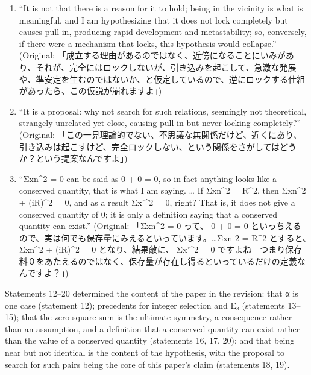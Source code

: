 \documentclass[
  a4paper,
]{article}
\begin{document}
\begin{enumerate}
  experiments too, without placing Σxn\^{}2=0 or U\^{}n=I as assumptions
  to derive from, they turned out to hold as a result; this is an
  empirical rule.'' (Original: 「Σxn\^{}2 = 0 も、U\^{}n=I
  と同様に、むしろ仮定ではなく、他の対称性の組み合わせで結果的に導出される\ldots 実際も過去の実験でも、Σxn\^{}2=0
  、U\^{}n=I
  を仮定として置いて導出しなくても、結果的に、それが成り立っていたという経験則です。」)
\item
  ``It is not that there is a reason for it to hold; being in the
  vicinity is what is meaningful, and I am hypothesizing that it does
  not lock completely but causes pull-in, producing rapid development
  and metastability; so, conversely, if there were a mechanism that
  locks, this hypothesis would collapse.'' (Original:
  「成立する理由があるのではなく、近傍になることにいみがあり、それが、完全にはロックしないが、引き込みを起こして、急激な発展や、準安定を生むのではないか、と仮定しているので、逆にロックする仕組があったら、この仮説が崩れますよ」)
\item
  ``It is a proposal: why not search for such relations, seemingly not
  theoretical, strangely unrelated yet close, causing pull-in but never
  locking completely?'' (Original:
  「この一見理論的でない、不思議な無関係だけど、近くにあり、引き込みは起こすけど、完全ロックしない、という関係をさがしてはどうか？という提案なんですよ」)
\item
  ``Σxn\^{}2 = 0 can be said as 0 + 0 = 0, so in fact anything looks
  like a conserved quantity, that is what I am saying. \ldots{} If
  Σxn\^{}2 = R\^{}2, then Σxn\^{}2 + (iR)\^{}2 = 0, and as a result
  Σx'\^{}2 = 0, right? That is, it does not give a conserved quantity of
  0; it is only a definition saying that a conserved quantity can
  exist.'' (Original: 「Σxn\^{}2 = 0 って、 0 + 0 = 0
  といっちえるので、実は何でも保存量にみえるといっています。\ldots Σxn-2
  = R\^{}2 とすると、　Σxn\^{}2 + (iR)\^{}2 = 0 となり、結果敵に、
  Σx'\^{}2 = 0
  ですよね　つまり保存料０をあたえるのではなく、保存量が存在し得るといっているだけの定義なんですよ？」)
\end{enumerate}

Statements 12--20 determined the content of the paper in the revision:
that α is one case (statement 12); precedents for integer selection and
E₈ (statements 13--15); that the zero square sum is the ultimate
symmetry, a consequence rather than an assumption, and a definition that
a conserved quantity can exist rather than the value of a conserved
quantity (statements 16, 17, 20); and that being near but not identical
is the content of the hypothesis, with the proposal to search for such
pairs being the core of this paper's claim (statements 18, 19).
\end{document}
